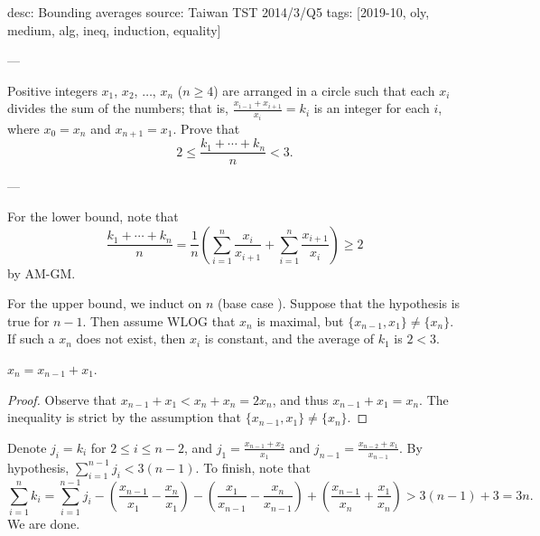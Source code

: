 desc: Bounding averages
source: Taiwan TST 2014/3/Q5
tags: [2019-10, oly, medium, alg, ineq, induction, equality]

---

Positive integers $x_1$, $x_2$, $\ldots$, $x_n$ ($n\ge4$) are arranged in a circle such that each $x_i$ divides the sum of the numbers; that is, $\frac{x_{i-1}+x_{i+1}}{x_i}=k_i$ is an integer for each $i$, where $x_0=x_n$ and $x_{n+1}=x_1$. Prove that \[2\le\frac{k_1+\cdots+k_n}n<3.\]

---

For the lower bound, note that \[\frac{k_1+\cdots+k_n}n=\frac1n\left(\sum_{i=1}^n\frac{x_i}{x_{i+1}}+\sum_{i=1}^n\frac{x_{i+1}}{x_i}\right)\ge2\]
by AM-GM.

For the upper bound, we induct on $n$ (base case ). Suppose that the hypothesis is true for $n-1$. Then assume WLOG that $x_n$ is maximal, but $\{x_{n-1},x_1\}\ne\{x_n\}$. If such a $x_n$ does not exist, then $x_i$ is constant, and the average of $k_1$ is $2<3$.
\begin{iclaim*}
    $x_n=x_{n-1}+x_1$.
\end{iclaim*}
\begin{proof}
    Observe that $x_{n-1}+x_1<x_n+x_n=2x_n$, and thus $x_{n-1}+x_1=x_n$. The inequality is strict by the assumption that $\{x_{n-1},x_1\}\ne\{x_n\}$.
\end{proof}

Denote $j_i=k_i$ for $2\le i\le n-2$, and $j_1=\frac{x_{n-1}+x_2}{x_1}$ and $j_{n-1}=\frac{x_{n-2}+x_1}{x_{n-1}}$. By hypothesis, $\sum_{i=1}^{n-1}j_i<3(n-1)$. To finish, note that \[\sum_{i=1}^nk_i=\sum_{i=1}^{n-1}j_i-\left(\frac{x_{n-1}}{x_1}-\frac{x_n}{x_1}\right)-\left(\frac{x_1}{x_{n-1}}-\frac{x_n}{x_{n-1}}\right)+\left(\frac{x_{n-1}}{x_n}+\frac{x_1}{x_n}\right)>3(n-1)+3=3n.\]
We are done.
